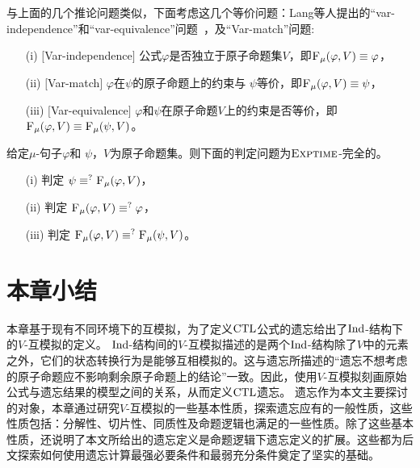 与上面的几个推论问题类似，下面考虑这几个等价问题：Lang等人提出的“var-independence”和“var-equivalence”问题~\cite{DBLP:journals/jair/LangLM03}，及“Var-match”问题:
\begin{itemize}
	\item[(i)] $[$Var-independence$]$ 公式$\varphi$是否独立于原子命题集$V$，即${\textsc{F}_{\textsc{$\mu$}}}(\varphi,V) \equiv \varphi$，
	\item[(ii)] $[$Var-match$]$  $\varphi$在$\psi$的原子命题上的约束与 $\psi$等价，即${\textsc{F}_{\textsc{$\mu$}}}(\varphi, V) \equiv \psi$，
	\item[(iii)] $[$Var-equivalence$]$  $\varphi$和$\psi$在原子命题$V$上的约束是否等价，即${\textsc{F}_{\textsc{$\mu$}}}(\varphi, V) \equiv {\textsc{F}_{\textsc{$\mu$}}}(\psi, V)$。
\end{itemize}

\begin{corollary}\label{chapter06:cor:equiv}
	给定$\mu$-句子$\varphi$和 $\psi$，$V$为原子命题集。则下面的判定问题为$\textsc{Exptime}$-完全的。
	\begin{itemize}
		\item[(i)] 判定 $\psi \equiv^?{\textsc{F}_{\textsc{$\mu$}}}(\varphi, V)$，
		\item[(ii)] 判定 ${\textsc{F}_{\textsc{$\mu$}}}(\varphi, V) \equiv^? \varphi$，
		\item[(iii)] 判定 ${\textsc{F}_{\textsc{$\mu$}}}(\varphi, V) \equiv^? {\textsc{F}_{\textsc{$\mu$}}}(\psi, V)$。
	\end{itemize}
\end{corollary}


\section{本章小结} 
本章基于现有不同环境下的互模拟，为了定义$\textrm{CTL}$公式的遗忘给出了$\textrm{Ind}$-结构下的$V$-互模拟的定义。
$\textrm{Ind}$-结构间的$V$-互模拟描述的是两个$\textrm{Ind}$-结构除了$V$中的元素之外，它们的状态转换行为是能够互相模拟的。这与遗忘所描述的“遗忘不想考虑的原子命题应不影响剩余原子命题上的结论”一致。因此，使用$V$-互模拟刻画原始公式与遗忘结果的模型之间的关系，从而定义$\textrm{CTL}$遗忘。
遗忘作为本文主要探讨的对象，本章通过研究$V$-互模拟的一些基本性质，探索遗忘应有的一般性质，这些性质包括：分解性、切片性、同质性及命题逻辑也满足的一些性质。除了这些基本性质，还说明了本文所给出的遗忘定义是命题逻辑下遗忘定义的扩展。这些都为后文探索如何使用遗忘计算最强必要条件和最弱充分条件奠定了坚实的基础。

